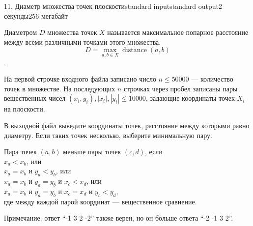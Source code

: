 \begin{problem}{11. Диаметр множества точек плоскости}{standard input}{standard output}{2 секунды}{256 мегабайт}

Диаметром $D$ множества точек $X$ называется максимальное попарное расстояние между всеми различными точками этого множества.
$$ D = \max\limits_{a, b \in X} \operatorname{distance}(a, b) $$.

\InputFile

На первой строчке входного файла записано число $n \le 50000$ — количество точек в множестве. На последующих $n$ строчках через пробел записаны пары вещественных чисел $(x_i, y_i), |x_i| , |y_i| \le 10000$, задающие координаты точек $X_i$ на плоскости.

\OutputFile
В выходной файл выведите координаты точек, расстояние между которыми равно диаметру. Если таких точек несколько, выберите минимальную пару.

Пара точек $(a, b)$ меньше пары точек $(c, d)$, если \\
$x_a < x_b$, или \\
$x_a = x_b$ и $y_a < y_b$, или \\
$x_a = x_b$ и $y_a = y_b$ и $x_c < x_d$, или \\
$x_a = x_b$ и $y_a = y_b$ и $x_c = x_d$ и $y_c < y_d$, \\
где между каждой парой координат — вещественное сравнение.

\Examples

\begin{example}%
%
\end{example}

\begin{example}
%
\end{example}

Примечание: ответ “-1 3 2 -2” также верен, но он больше ответа “-2 -1 3 2”.

\end{problem}
